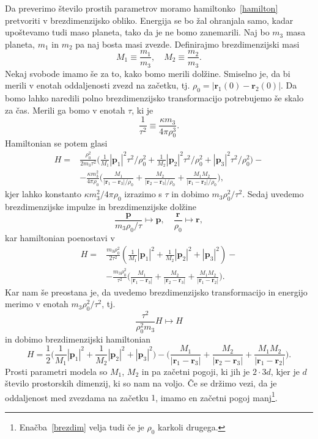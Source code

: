 \documentclass[12pt, a4paper]{article}
\renewcommand{\r}{
    \ensuremath{\mathbf{r}}
}
\newcommand{\p}{
    \ensuremath{\mathbf{p}}
}
\newcommand{\sfrac}[2]{
    \ensuremath{\textstyle{\frac{#1}{#2}}}
}
\newcommand{\Frac}[2]{
    \ensuremath{\displaystyle{\frac{#1}{#2}}}
}
\begin{document}
Da preverimo \v stevilo prostih parametrov moramo hamiltonko~\eqref{hamilton} pretvoriti v brezdimenzijsko
obliko. Energija se bo \v zal ohranjala samo, kadar upo\v stevamo tudi maso planeta, tako da je ne bomo
zanemarili. Naj bo $m_3$ masa planeta, $m_1$ in $m_2$ pa naj bosta masi zvezde. Definirajmo brezdimenzijski
masi
\begin{equation}
    M_1 \equiv \frac{m_1}{m_3}, \quad M_2 \equiv \frac{m_2}{m_3}.
\end{equation}
Nekaj svobode imamo \v se za to, kako bomo merili dol\v zine. Smiselno je, da bi merili v enotah oddaljenosti
zvezd na za\v cetku, tj. $\rho_0 = |\r_1 (0) - \r_2 (0)|$. Da bomo lahko naredili polno brezdimenzijsko
transformacijo potrebujemo \v se skalo za \v cas. Merili ga bomo v enotah $\tau$, ki je
\[
    \frac{1}{\tau^2} \equiv \frac{\kappa m_3}{4\pi\rho_0^3}.
\]
Hamiltonian se potem glasi
\begin{align*}
    H =& \frac{\rho_0^2}{2 m_3\tau^2} \big(\sfrac{1}{M_1}|\p_1|^2\tau^2/\rho_0^2 + \sfrac{1}{M_2}|\p_2|^2\tau^2/\rho_0^2 +
        |\p_3|^2\tau^2/\rho_0^2\big) -\\
       &- \Frac{\kappa m_3^2}{4\pi\rho_0}\bigg(\Frac{M_1}{|\r_1 - \r_3|/\rho_0} + \Frac{M_2}{|\r_2 - \r_3|/\rho_0} +
        \Frac{M_1 M_2}{|\r_1 - \r_2|/\rho_0}\bigg),
\end{align*}
kjer lahko konstanto $\kappa m_3^2/4\pi\rho_0$ izrazimo s $\tau$ in dobimo $m_3\rho_0^2/\tau^2$.
Sedaj uvedemo brezdimenzijske impulze in brezdimenzijske dol\v zine
\begin{equation}
    \frac{\p}{m_3\rho_0/\tau} \mapsto \p, \quad \frac{\r}{\rho_0} \mapsto \r,
\end{equation}
kar hamiltonian poenostavi v
\begin{align*}
    H =& \frac{m_3\rho_0^2}{2\tau^2} (\sfrac{1}{M_1}|\p_1|^2 + \sfrac{1}{M_2}|\p_2|^2 + |\p_3|^2) -\\
       &- \Frac{m_3\rho_0^2}{\tau^2}\bigg(\Frac{M_1}{|\r_1 - \r_3|} + \Frac{M_2}{|\r_2 - \r_3|} +
        \Frac{M_1 M_2}{|\r_1 - \r_2|}\bigg).
\end{align*}
Kar nam \v se preostana je, da uvedemo brezdimenzijsko transformacijo in energijo merimo v enotah
$m_3\rho_0^2/\tau^2$, tj.
\[
    \frac{\tau^2}{\rho_0^2 m_3}H \mapsto H
\]
in dobimo brezdimenzijski hamiltonian
\begin{equation}
    H = \frac{1}{2}\Big(\sfrac{1}{M_1}|\p_1|^2 + \sfrac{1}{M_2}|\p_2|^2 + |\p_3|^2\Big)
        - \bigg(\Frac{M_1}{|\r_1 - \r_3|} + \Frac{M_2}{|\r_2 - \r_3|} + \Frac{M_1 M_2}{|\r_1 - \r_2|}\bigg).
    \label{brezdim}
\end{equation}
Prosti parametri modela so $M_1$, $M_2$ in pa za\v cetni pogoji, ki jih je $2 \cdot 3d$, kjer je $d$
\v stevilo prostorskih dimenzij, ki so nam na voljo. \v Ce se dr\v zimo vezi, da je oddaljenost med zvezdama
na za\v cetku $1$, imamo en za\v cetni pogoj manj\footnote{Ena\v cba~\eqref{brezdim} velja tudi \v ce je
$\rho_0$ karkoli drugega.}.
\end{document}

